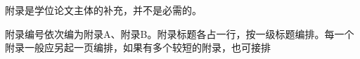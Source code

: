 
\begin{thesisappendix}
    附录是学位论文主体的补充，并不是必需的。
    
    附录编号依次编为附录A、附录B。附录标题各占一行，按一级标题编排。每一个附录一般应另起一页编排，如果有多个较短的附录，也可接排
\end{thesisappendix}


